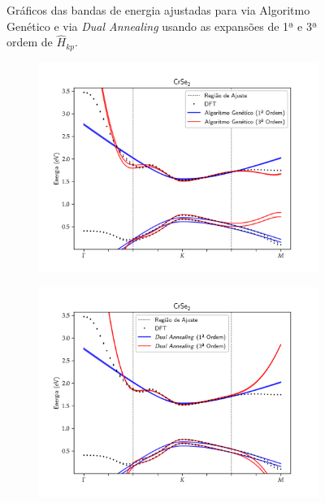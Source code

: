 \begin{figure}[p]
\begin{subfigure}{\textwidth}
    \caption{}
    \label{fig:crs2_dual_annealing}
  \end{subfigure}
  \caption{
    Gráficos das bandas de energia ajustadas para  via Algoritmo Genético
     e via \textit{Dual Annealing} 
    usando as expansões de 1ª e 3ª ordem de $ \hat{H}_{kp} $.
  }
  \label{fig:crs2}
\end{figure}

\begin{figure}[p]
  \centering
  \begin{subfigure}{\textwidth}
    \includegraphics[trim=0 0.6cm 0 0.6cm,clip,width=\textwidth]{imagens/crse2_genetic_algorithm_order_13.png}
    \caption{}
    \label{fig:crse2_genetic_algorithm}
  \end{subfigure}
  \begin{subfigure}{\textwidth}
    \includegraphics[trim=0 0.6cm 0 0.6cm,clip,width=\textwidth]{imagens/crse2_dual_annealing_order_13.png}

\end{subfigure}
\end{figure}
